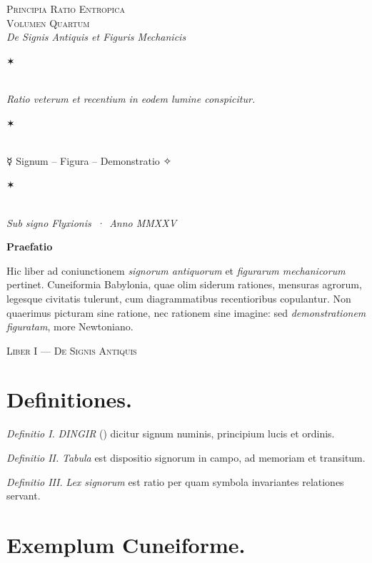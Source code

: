 \documentclass[12pt]{article}
\newcommand{\dingir}{\centerline{\Large \cunei{𒀭}}}
\newcommand{\aster}{\centerline{✶}}
\newcommand{\divider}{\vspace{1em}\dingir\vspace{1em}}
\newcommand{\Liber}[1]{\vspace{1ex}\begin{center}\Large\textsc{Liber #1}\end{center}\vspace{-0.5ex}\dingir\vspace{0.5ex}}
\begin{document}
\begin{center}
{\Large \textsc{Principia Ratio Entropica}}\\[-0.25ex]
{\small \textsc{Volumen Quartum}}\\[0.5ex]
{\itshape De Signis Antiquis et Figuris Mechanicis}\\[1.25em]
\aster\\[0.5em]
{\itshape Ratio veterum et recentium in eodem lumine conspicitur.}\\[0.5em]
\aster\\[0.75em]
{\large ☿\; Signum \;--\; Figura \;--\; Demonstratio \;✧}\\[0.75em]
\aster\\[0.25em]
{\itshape Sub signo Flyxionis \,·\, Anno MMXXV}
\end{center}

\divider

\begin{center}\textbf{Praefatio}\end{center}

Hic liber ad coniunctionem \textit{signorum antiquorum} et \textit{figurarum mechanicorum} pertinet. Cuneiformia Babylonia, quae olim siderum rationes, mensuras agrorum, legesque civitatis tulerunt, cum diagrammatibus recentioribus copulantur. Non quaerimus picturam sine ratione, nec rationem sine imagine: sed \textit{demonstrationem figuratam}, more Newtoniano.

\divider

\Liber{I — De Signis Antiquis}

\section*{Definitiones.}

\textit{Definitio I.} \; \textit{DINGIR} () dicitur signum numinis, principium lucis et ordinis.

\textit{Definitio II.} \; \textit{Tabula} est dispositio signorum in campo, ad memoriam et transitum.

\textit{Definitio III.} \; \textit{Lex signorum} est ratio per quam symbola invariantes relationes servant.

\section*{Exemplum Cuneiforme.}
\end{document}
